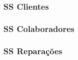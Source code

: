 \documentclass[../../relatorio.tex]{subfiles}
\begin{document}
\subsubsection{SS Clientes} \label{sec:ss_clientes}
    
\subsubsection{SS Colaboradores} \label{sec:ss_colaboradores}
    
\subsubsection{SS Reparações} \label{sec:ss_reparacoes}
    
\end{document}
